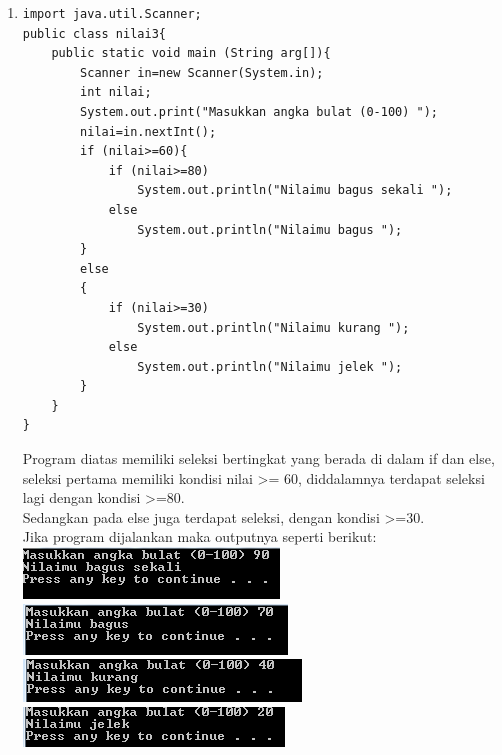 \documentclass[a4paper,12pt]{article}
\begin{document}
\begin{enumerate}[label=\textbf{\arabic* .}]
            \newpage
        \item
            \begin{lstlisting}[frame=single]
import java.util.Scanner;
public class nilai3{
    public static void main (String arg[]){
        Scanner in=new Scanner(System.in);
        int nilai;
        System.out.print("Masukkan angka bulat (0-100) ");
        nilai=in.nextInt();
        if (nilai>=60){
            if (nilai>=80)
                System.out.println("Nilaimu bagus sekali ");
            else
                System.out.println("Nilaimu bagus ");
        }
        else
        {
            if (nilai>=30)
                System.out.println("Nilaimu kurang ");
            else
                System.out.println("Nilaimu jelek ");
        }
    }
}               
            \end{lstlisting}
            Program diatas memiliki seleksi bertingkat yang berada di dalam if dan else, seleksi pertama memiliki kondisi nilai >= 60, diddalamnya terdapat
            seleksi lagi dengan kondisi >=80.\\
            Sedangkan pada else juga terdapat seleksi, dengan kondisi >=30.\\
            Jika program dijalankan maka outputnya seperti berikut:\\
            \includegraphics{03b.PNG}
            \includegraphics{03c.PNG}
            \includegraphics{03d.PNG}
            \includegraphics{03e.PNG}

            \newpage


\end{enumerate}
\end{document}
